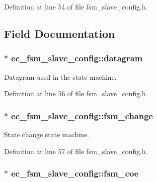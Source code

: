 \-Definition at line 54 of file fsm\-\_\-slave\-\_\-config.\-h.



\subsection{\-Field \-Documentation}
\subsubsection[{datagram}]{$\ast$ {\bf ec\-\_\-fsm\-\_\-slave\-\_\-config\-::datagram}}\label{structec__fsm__slave__config_a6b7e0ac3aa324aede3c39467672f7201}


\-Datagram used in the state machine. 



\-Definition at line 56 of file fsm\-\_\-slave\-\_\-config.\-h.

\subsubsection[{fsm\-\_\-change}]{$\ast$ {\bf ec\-\_\-fsm\-\_\-slave\-\_\-config\-::fsm\-\_\-change}}\label{structec__fsm__slave__config_a1e2372d1d2ca00c551f93a503d06586d}


\-State change state machine. 



\-Definition at line 57 of file fsm\-\_\-slave\-\_\-config.\-h.

\subsubsection[{fsm\-\_\-coe}]{$\ast$ {\bf ec\-\_\-fsm\-\_\-slave\-\_\-config\-::fsm\-\_\-coe}}\label{structec__fsm__slave__config_a6c1f6900f5043f39d2d11250e5738dd0}



